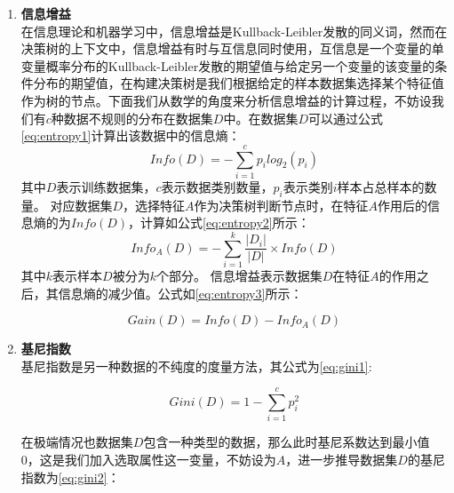 \begin{enumerate}
    \item \textbf{信息增益} \\ 
    在信息理论和机器学习中，信息增益是Kullback-Leibler发散的同义词，然而在决策树的上下文中，信息增益有时与互信息同时使用，互信息是一个变量的单变量概率分布的Kullback-Leibler发散的期望值与给定另一个变量的该变量的条件分布的期望值，在构建决策树是我们根据给定的样本数据集选择某个特征值作为树的节点。下面我们从数学的角度来分析信息增益的计算过程，不妨设我们有$c$种数据不规则的分布在数据集$D$中。在数据集$D$可以通过公式\ref{eq:entropy1}计算出该数据中的信息熵：
    {\setlength\abovedisplayskip{15pt}
    \setlength\belowdisplayskip{15pt}
    \begin{equation}
        \label{eq:entropy1}
        Info(D)=-\sum_{i=1}^{c}p_{i}log_{2}(p_{i})
    \end{equation}}
    其中$D$表示训练数据集，$c$表示数据类别数量，$p_{i}$表示类别$i$样本占总样本的数量。
    对应数据集$D$，选择特征$A$作为决策树判断节点时，在特征$A$作用后的信息熵的为$Info(D)$，计算如公式\ref{eq:entropy2}所示：
    {\setlength\abovedisplayskip{15pt}
    \setlength\belowdisplayskip{15pt}
    \begin{equation}
        \label{eq:entropy2}
        Info_{A}(D)=-\sum_{i=1}^{k}\frac{|D_{i}|}{|D|}\times Info(D)
    \end{equation}}  
    其中$k$表示样本$D$被分为$k$个部分。
    信息增益表示数据集$D$在特征$A$的作用之后，其信息熵的减少值。公式如\ref{eq:entropy3}所示：
    
    {\setlength\abovedisplayskip{15pt}
    \setlength\belowdisplayskip{15pt}
    \begin{equation}
        \label{eq:entropy3}
        Gain(D)=Info(D)-Info_{A}(D)
    \end{equation}}

    \item \textbf{基尼指数}\\ 
    基尼指数是另一种数据的不纯度的度量方法，其公式为\ref{eq:gini1}:
    
    {\setlength\abovedisplayskip{15pt}
    \setlength\belowdisplayskip{15pt}
    \begin{equation}
        \label{eq:gini1}
        Gini(D)=1-\sum_{i=1}^{c}p_{i}^2
    \end{equation}}

    在极端情况也数据集$D$包含一种类型的数据，那么此时基尼系数达到最小值0，这是我们加入选取属性这一变量，不妨设为$A$，进一步推导数据集$D$的基尼指数为\ref{eq:gini2}：
    

\end{enumerate}
